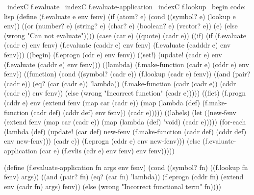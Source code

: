 \ indexC {f.evaluate}
\ indexC {f.evaluate-application}
\ indexC {f.lookup}
\ begin {code: lisp}
(define (f.evaluate e env fenv)
  (if (atom? e)
      (cond ((symbol? e) (lookup e env))
            ((or (number? e) (string? e) (char? e)
                 (boolean? e) (vector? e))
             (e)
            (else (wrong "Can not evaluate"))))
      (case (car e)
        ((quote) (cadr e))
        ((if) (if (f.evaluate (cadr e) env fenv)
                      (f.evaluate (caddr e) env fenv)
                      (f.evaluate (cadddr e) env fenv)))
        ((begin) (f.eprogn (cdr e) env fenv))
        ((set!) (update! (cadr e)
                           env
                           (f.evaluate (caddr e) env fenv)))
        ((lambda) (f.make-function (cadr e) (cddr e) env fenv))
        ((function)
         (cond ((symbol? (cadr e))
                (f.lookup (cadr e) fenv))
               ((and (pair? (cadr e)) (eq? (car (cadr e)) 'lambda))
                (f.make-function
                 (cadr (cadr e)) (cddr (cadr e)) env fenv))
               (else (wrong "Incorrect function" (cadr e)))))
        ((flet)
         (f.progn (cddr e)
                  env
                  (extend fenv (map car (cadr e))
                          (map (lambda (def)
                                 (f.make-function (cadr def)
                                                  (cddr def)
                                                  env fenv))
                               (cadr e)))))
        ((labels)
         (let ((new-fenv (extend fenv
                                 (map car (cadr e))
                                 (map (lambda (def) 'void)
                                      (cadr e)))))
           (for-each (lambda (def)
                       (update! (car def)
                                new-fenv
                                (f.make-function (cadr def) (cddr def)
                                                 env new-fenv)))
                     (cadr e))
           (f.eprogn (cddr e) env new-fenv)))
        (else (f.evaluate-application (car e)
                                      (f.evlis (cdr e) env fenv)
                                      env
                                      fenv)))))

(define (f.evaluate-application fn args env fenv)
  (cond ((symbol? fn)
         ((f.lookup fn fenv) args))
        ((and (pair? fn) (eq? (car fn) 'lambda))
         (f.eprogn (cddr fn)
                   (extend env (cadr fn) args)
                   fenv))
        (else (wrong "Incorrect functional term" fn))))

